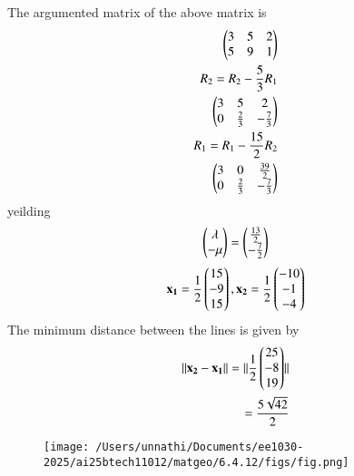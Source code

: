 \documentclass[journal]{IEEEtran}
\begin{document}
The argumented matrix of the above matrix is 
\begin{align}
 \begin{pmatrix}3 & 5 & 2\\5 & 9 & 1\end{pmatrix} \\
 R_2 = R_2 - \frac{5}{3}R_1 \\
 \begin{pmatrix}3 & 5 & 2\\0 & \frac{2}{3} & -\frac{7}{3}\end{pmatrix} \\
R_1 = R_1 - \frac{15}{2}R_2\\
 \begin{pmatrix}3 & 0 & \frac{39}{2}\\0 & \frac{2}{3} & -\frac{7}{3}\end{pmatrix}
 \end{align}
 yeilding 
\begin{align}
    \begin{pmatrix}\lambda \\ -\mu\end{pmatrix} = \begin{pmatrix}\frac{13}{2} \\ -\frac{7}{2}\end{pmatrix}
\end{align}
\begin{align}
    \mathbf{x_1} =\frac{1}{2} \begin{pmatrix}15 \\ -9 \\ 15\end{pmatrix} ,
        \mathbf{x_2} =\frac{1}{2} \begin{pmatrix}-10 \\ -1 \\ -4\end{pmatrix}
\end{align}
The minimum distance between the lines is given by
\begin{align}
    \lVert \mathbf{x_2} - \mathbf{x_1} \rVert = \lVert \frac{1}{2}\begin{pmatrix}25 \\ -8 \\ 19\end{pmatrix} \rVert \\
     = \frac{5\sqrt{42}}{2}
\end{align}
\begin{figure}[h!]
   \centering
   \texttt{[image: /Users/unnathi/Documents/ee1030-2025/ai25btech11012/matgeo/6.4.12/figs/fig.png]}
   \caption{}
   \label{stemplot}
\end{figure}
\end{document}
